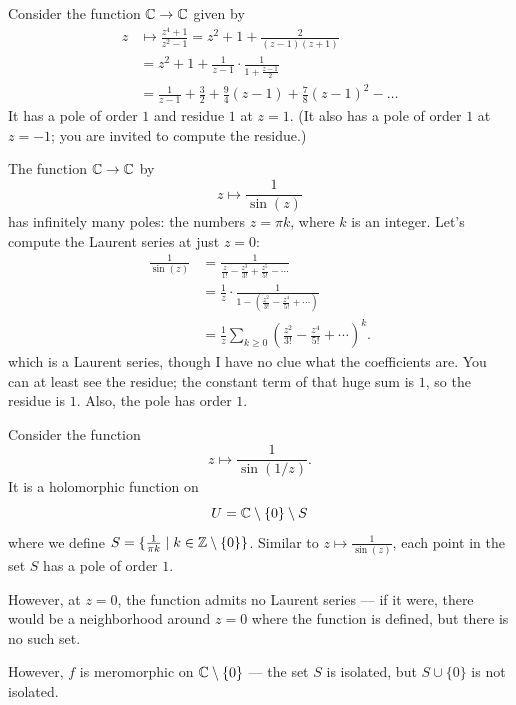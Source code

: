 \begin{example}
	Consider the function $\mathbb C \to \mathbb C$ given by
	\begin{align*}
		z &\mapsto \frac{z^4+1}{z^2-1} = z^2 + 1 + \frac{2}{(z-1)(z+1)} \\
		&= z^2 + 1 + \frac1{z-1} \cdot \frac{1}{1+\frac{z-1}{2}} \\
		&= \frac{1}{z-1} + \frac32 + \frac94(z-1) + \frac{7}{8}(z-1)^2 - \dots
	\end{align*}
	It has a pole of order $1$ and residue $1$ at $z=1$.
	(It also has a pole of order $1$ at $z=-1$; you are invited to compute the residue.)
\end{example}
\begin{example}
	The function $\mathbb C \to \mathbb C$ by \[ z \mapsto \frac{1}{\sin(z)} \]
	has infinitely many poles: the numbers $z = \pi k$, where $k$ is an integer.
	Let's compute the Laurent series at just $z=0$:
	\begin{align*}
		\frac{1}{\sin(z)}
		&= \frac{1}{\frac{z}{1!} - \frac{z^3}{3!} + \frac{z^5}{5!} - \dotsb} \\
		&= \frac 1z \cdot \frac{1}{1 - \left( \frac{z^2}{3!} - \frac{z^4}{5!} + \dotsb \right)} \\
		&= \frac 1z \sum_{k \ge 0} \left( \frac{z^2}{3!} - \frac{z^4}{5!} + \dotsb \right)^k.
	\end{align*}
	which is a Laurent series, though I have no clue what the coefficients are.
	You can at least see the residue; the constant term of that huge sum is $1$,
	so the residue is $1$.
	Also, the pole has order $1$.
\end{example}
\begin{example}
	Consider the function
	\[ z \mapsto \frac{1}{\sin(1/z)}. \]
	It is a holomorphic function on
	\[ U = \mathbb C \setminus \{ 0 \} \setminus S \]
	where we define $S = \{ \frac{1}{\pi k} \mid k \in \mathbb Z \setminus \{ 0 \} \}$.
	Similar to $z \mapsto \frac{1}{\sin(z)}$,
	each point in the set $S$ has a pole of order $1$.

	However, at $z = 0$, the function admits no Laurent series --- if it were, there would be a
	neighborhood around $z = 0$ where the function is defined, but there is no such set.

	However, $f$ is meromorphic on $\mathbb C \setminus \{ 0 \}$ --- the set $S$ is isolated, but $S \cup
	\{ 0 \}$ is not isolated.
\end{example}


